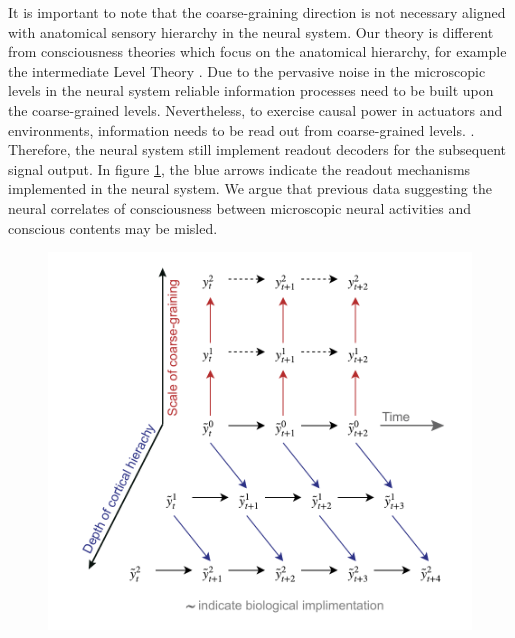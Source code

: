 \documentclass[utf8]{article}
\begin{document}
        It is important to note that the coarse-graining direction is not necessary aligned with  anatomical sensory hierarchy in the neural system. Our theory is different from consciousness theories which focus on the anatomical hierarchy, for example the intermediate Level Theory \citep[see also \ref{IntermediateLevelTheory}]{prinz2007intermediate, jackendoff1987consciousness}. Due to the pervasive noise in the microscopic levels in the neural system reliable information processes need to be built upon the coarse-grained levels. Nevertheless, to exercise causal power in actuators and environments, information needs to be read out from coarse-grained levels. . Therefore, the neural system still implement readout decoders for the subsequent signal output. In figure \ref{fig:hierarchy}, the blue arrows indicate the readout mechanisms implemented in the neural system. We argue that previous data suggesting the neural correlates of consciousness between microscopic neural activities and conscious contents may be misled. 

        
			\begin{figure}[H]
				\includegraphics[width=\textwidth]{WritingMaterials/Fig_SeperationOfCGandCortHierachy/SeperationOfCGandCortHierachy.pdf}
				\label{fig:hierarchy}
			\end{figure}
\end{document}
